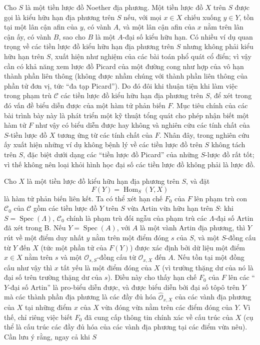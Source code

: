 Cho $S$ là một tiền lược đồ Noether địa phương. Một tiền lược đồ $X$ trên
$S$ được gọi là kiểu hữu hạn địa phương trên $S$ nếu, với mọi
$x\in X$ chiếu xuống $y\in Y$, tồn tại một lân cận afin của $y$, có vành $A$,
và một lân cận afin của $x$ nằm trên lân cận ấy, có vành $B$, sao cho $B$ là
một $A$-đại số kiểu hữu hạn. Có nhiều ví dụ quan trọng về các tiền lược đồ kiểu
hữu hạn địa phương trên $S$ nhưng không phải kiểu hữu hạn trên $S$, xuất hiện
như nghiệm của các bài toán phổ quát cổ điển; vì vậy cần có khả năng xem lược
đồ Picard của một đường cong như hợp của vô hạn thành phần liên thông (không
được nhầm chúng với thành phần liên thông của phần tử đơn vị, tức ``đa tạp
Picard''). Do đó đôi khi thuận tiện khi làm việc trong phạm trù $\mathcal C$
các tiền lược đồ kiểu hữu hạn địa phương trên $S$, để xét trong đó vấn đề biểu
diễn được của một hàm tử phản biến $F$. Mục tiêu chính của các bài trình bày
này là phát triển một kỹ thuật tổng quát cho phép nhận biết một hàm tử $F$ như
vậy có biểu diễn được hay không và nghiên cứu các tính chất của $S$-tiền lược
đồ $X$ tương ứng từ các tính chất của $F$. Nhân đây, trong nghiên cứu ấy xuất
hiện những ví dụ không bệnh lý về các tiền lược đồ trên $S$ không tách trên
$S$, đặc biệt dưới dạng các ``tiền lược đồ Picard'' của những $S$-lược đồ rất
tốt; vì thế không nên loại khỏi hình học đại số các tiền lược đồ không phải là
lược đồ.

Cho $X$ là một tiền lược đồ kiểu hữu hạn địa phương trên $S$, và đặt
\[
  F(Y)=\operatorname{Hom}_S(Y,X)
\]
là hàm tử phản biến liên kết. Ta có thể xét hạn chế $F_0$ của $F$ lên phạm trù
con $\mathcal C_0$ của $\mathcal C$ gồm các tiền lược đồ $Y$ trên $S$ vừa
Artin vừa hữu hạn trên $S$: khi $S=\operatorname{Spec}(\Lambda)$,
$\mathcal C_0$ chính là phạm trù đối ngẫu của phạm trù các $\Lambda$-đại số
Artin đã xét trong B. Nếu $Y=\operatorname{Spec}(A)$, với $A$ là một vành
Artin địa phương, thì $Y$ rút về một điểm duy nhất $y$ nằm trên một điểm đóng
$s$ của $S$, và một $S$-đồng cấu từ $Y$ đến $X$ (tức một phần tử của $F(Y)$)
được xác định bởi dữ liệu một điểm $x\in X$ nằm trên $s$ và một
$\mathcal O_{s,S}$-đồng cấu từ $\mathcal O_{x,X}$ đến $A$. Nếu tồn tại một
đồng cấu như vậy thì $x$ tất yếu là một điểm đóng của $X$ (vì trường thặng dư
của nó là đại số trên trường thặng dư của $s$). Điều này cho thấy hạn chế
$F_0$ của $F$ lên các ``$Y$-đại số Artin'' là pro-biểu diễn được, và được biểu
diễn bởi đại số tôpô trên $Y$ mà các thành phần địa phương là các đầy đủ hóa
$\widehat{\mathcal O}_{x,X}$ của các vành địa phương của $X$ tại những điểm
$x$ của $X$ vừa đóng vừa nằm trên các điểm đóng của $Y$. Vì thế, chỉ riêng
việc biết $F_0$ đã cung cấp thông tin chính xác về cấu trúc của $X$ (cụ thể là
cấu trúc các đầy đủ hóa của các vành địa phương tại các điểm vừa nêu). Cần lưu
ý rằng, ngay cả khi $S$

